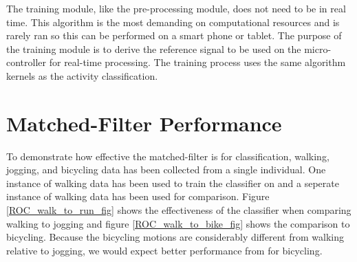 \documentclass[journal]{IEEEtran}
\begin{document}
The training module, like the pre-processing module, does not need to be in real time.
This algorithm is the most demanding on computational resources and is rarely ran so this can be performed on a smart phone or tablet.
The purpose of the training module is to derive the reference signal to be used on the micro-controller for real-time processing.
The training process uses the same algorithm kernels as the activity classification.
%
\section{Matched-Filter Performance}
%
To demonstrate how effective the matched-filter is for classification, walking, jogging, and bicycling data has been collected from a single individual. One instance of walking data has been used to train the classifier on and a seperate instance of walking data has been used for comparison. Figure \ref{ROC_walk_to_run_fig} shows the effectiveness of the classifier when comparing walking to jogging and figure \ref{ROC_walk_to_bike_fig} shows the comparison to bicycling. Because the bicycling motions are considerably different from walking relative to jogging, we would expect better performance from for bicycling.
\end{document}
